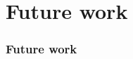 \documentclass[dvipdfmx,cjk]{beamer}
\theoremstyle{example}
\begin{document}
\section{Future work}

\begin{frame}
  \frametitle{Future work}

\end{frame}
                          
\end{document}

